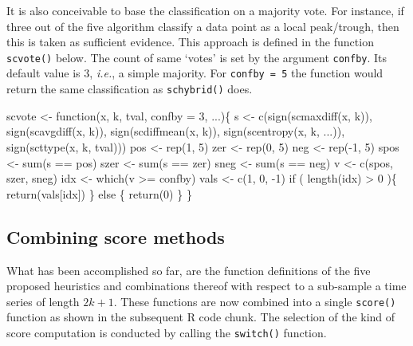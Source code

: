 \documentclass[a4paper]{article}
\begin{document}
It is also conceivable to base the classification on a majority
vote. For instance, if three out of the five algorithm classify a data
point as a local peak/trough, then this is taken as sufficient
evidence. This approach is defined in the function \verb?scvote()? below.
The count of same `votes' is set by the argument \texttt{confby}. Its
default value is $3$, \emph{i.e.}, a simple majority. For
\texttt{confby = 5} the function would return the same classification
as \verb?schybrid()? does.

\nwenddocs{}\endmoddef
scvote <- function(x, k, tval, confby = 3, ...)\{
    s <- c(sign(scmaxdiff(x, k)),
           sign(scavgdiff(x, k)),
           sign(scdiffmean(x, k)),
           sign(scentropy(x, k, ...)),
           sign(scttype(x, k, tval)))
    pos <- rep(1, 5)
    zer <- rep(0, 5)
    neg <- rep(-1, 5)
    spos <- sum(s == pos)
    szer <- sum(s == zer)
    sneg <- sum(s == neg)
    v <- c(spos, szer, sneg)
    idx <- which(v >= confby)
    vals <- c(1, 0, -1)
    if ( length(idx) > 0 )\{
        return(vals[idx])
    \} else \{
        return(0)
    \}
\}
\eatline
{}\nwendcode{}%

\subsection{Combining score methods}
\label{S2SS3}

What has been accomplished so far, are the function definitions of the
five proposed heuristics and combinations thereof with respect to a
sub-sample a time series of length $2k + 1$. These functions are
now combined into a single \verb?score()? function as shown in the
subsequent R code chunk. The selection of the kind of score
computation is conducted by calling the \verb?switch()? function.
\end{document}
